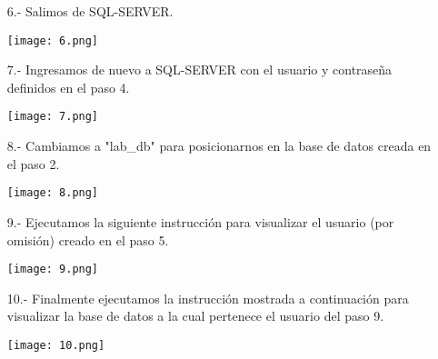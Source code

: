 \documentclass[12pt, letterpaper]{article}
\begin{document}
\begin{itemize}
            \item[6.-] Salimos de SQL-SERVER. \vspace{.1cm}
            
            \begin{center}
                \texttt{[image: 6.png]}
            \end{center}

            \item[7.-]  Ingresamos de nuevo a SQL-SERVER con el usuario y contraseña
                        definidos en el paso 4. \vspace{.1cm}
            
            \begin{center}
                \texttt{[image: 7.png]}
            \end{center}

            \item[8.-]  Cambiamos a "lab\_db" para posicionarnos en la base de datos
                        creada en el paso 2.\vspace{.1cm}
            
            \begin{center}
                \texttt{[image: 8.png]}
            \end{center}

            \item[9.-]  Ejecutamos la siguiente instrucción para visualizar el usuario
                        (por omisión) creado en el paso 5. \vspace{.1cm}
            
            \begin{center}
                \texttt{[image: 9.png]}
            \end{center}

            \item[10.-] Finalmente ejecutamos la instrucción mostrada a continuación para visualizar
                        la base de datos a la cual pertenece el usuario del paso 9. \vspace{.1cm}
            
            \begin{center}
                \texttt{[image: 10.png]}
            \end{center}

            
        \end{itemize}
\end{document}
